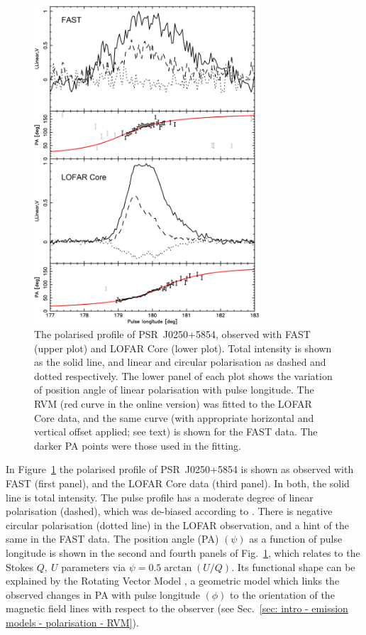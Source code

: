 \begin{figure}
    \begin{center}
        \includegraphics[width=0.75\textwidth]{Figures/J0250/polarised_profiles_BW}
        \caption[The polarised FAST and LOFAR Core profiles of PSR~J0250+5854]{The polarised profile of PSR~J0250+5854, observed with FAST (upper plot) and LOFAR Core (lower plot). Total intensity is shown as the solid line, and linear and circular polarisation as dashed and dotted respectively. The lower panel of each plot shows the variation of position angle of linear polarisation with pulse longitude. The RVM (red curve in the online version) was fitted to the LOFAR Core data, and the same curve (with appropriate horizontal and vertical offset applied; see text) is shown for the FAST data. The darker PA points were those used in the fitting.}
        \label{fig: J0250 - polarised profiles}
    \end{center}
\end{figure}
   
In Figure~\ref{fig: J0250 - polarised profiles} the polarised profile of PSR~J0250+5854 is shown as observed with FAST (first panel), and the LOFAR Core data (third panel). In both, the solid line is total intensity. The pulse profile has a moderate degree of linear polarisation (dashed), which was de-biased according to \citet{WKxx1974}. There is negative circular polarisation (dotted line) in the LOFAR observation, and a hint of the same in the FAST data. The position angle (PA) $(\psi)$ as a function of pulse longitude is shown in the second and fourth panels of Fig.~\ref{fig: J0250 - polarised profiles}, which relates to the Stokes $Q,\ U$ parameters via $\psi = 0.5 \arctan(U/Q)$. Its functional shape can be explained by the Rotating Vector Model \citep[RVM;][]{RCxx1969}, a geometric model which links the observed changes in PA with pulse longitude $(\phi)$ to the orientation of the magnetic field lines with respect to the observer (see Sec.~\ref{sec: intro - emission models - polarisation - RVM}).

